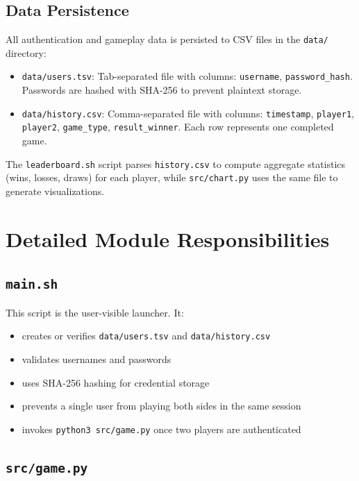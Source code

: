 \documentclass[12pt,a4paper]{article}
\begin{document}
\subsection{Data Persistence}

All authentication and gameplay data is persisted to CSV files in the \texttt{data/} directory:

\begin{itemize}
    \item \texttt{data/users.tsv}: Tab-separated file with columns: \texttt{username}, \texttt{password\_hash}. Passwords are hashed with SHA-256 to prevent plaintext storage.
    \item \texttt{data/history.csv}: Comma-separated file with columns: \texttt{timestamp}, \texttt{player1}, \texttt{player2}, \texttt{game\_type}, \texttt{result\_winner}. Each row represents one completed game.
\end{itemize}

The \texttt{leaderboard.sh} script parses \texttt{history.csv} to compute aggregate statistics (wins, losses, draws) for each player, while \texttt{src/chart.py} uses the same file to generate visualizations.

\section{Detailed Module Responsibilities}

\subsection{\texttt{main.sh}}

This script is the user-visible launcher. It:

\begin{itemize}
    \item creates or verifies \texttt{data/users.tsv} and \texttt{data/history.csv}
    \item validates usernames and passwords
    \item uses SHA-256 hashing for credential storage
    \item prevents a single user from playing both sides in the same session
    \item invokes \texttt{python3 src/game.py} once two players are authenticated
\end{itemize}

\subsection{\texttt{src/game.py}}
\end{document}
